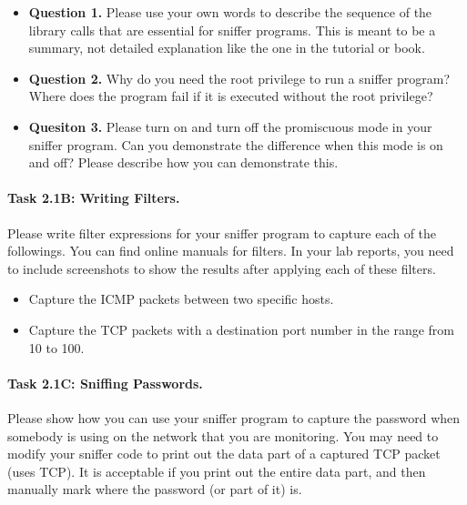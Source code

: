 \begin{itemize}
\item \textbf{Question 1.} Please use your own words to describe the sequence of the 
library calls that are essential for sniffer programs. This 
is meant to be a summary, not detailed explanation like the 
one in the tutorial or book.
 
\item \textbf{Question 2.} Why do you need the root privilege to run a sniffer program? Where
does the program fail if it is executed without the root privilege?


\item \textbf{Quesiton 3.} Please turn on and turn off the promiscuous mode in your sniffer
program. Can you demonstrate the difference when this mode is on and off? Please describe how
you can demonstrate this.
\end{itemize}


\paragraph{Task 2.1B: Writing Filters.}
Please write filter expressions for your sniffer program 
to capture each of the followings. You can find online 
manuals for \pcap filters.
In your lab reports, you need to include screenshots to show
the results after applying each of these filters. 
\begin{itemize}
\item Capture the ICMP packets between two specific hosts.
\item Capture the TCP packets with a destination port number 
      in the range from 10 to 100.  
\end{itemize}



\paragraph{Task 2.1C: Sniffing Passwords.}
Please show how you can use your sniffer program to capture the 
password when somebody is using \telnet on the 
network that you are monitoring. You may need to modify
your sniffer code to print out the data part of a captured TCP 
packet (\telnet uses TCP). It is acceptable if you print out the entire data part, and then
manually mark where the password (or part of it) is.




